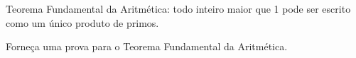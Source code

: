 \begin{definition}
Teorema Fundamental da Aritmética: todo inteiro maior que 1 pode ser escrito como um único produto de primos.
\end{definition}

\begin{exercise}
Forneça uma prova para o Teorema Fundamental da Aritmética.
\end{exercise}